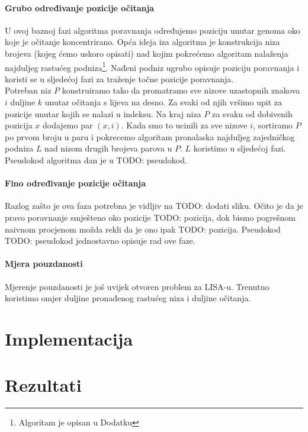\documentclass[times, utf8, diplomski]{fer}
\begin{document}
\subsubsection{Grubo određivanje pozicije očitanja}

U ovoj baznoj fazi algoritma poravnanja određujemo poziciju unutar genoma oko koje je očitanje koncentrirano. Opća ideja iza algoritma je konstrukcija niza brojeva (kojeg ćemo uskoro opisati) nad kojim pokrećemo algoritam nalaženja najduljeg rastućeg podniza\footnote{Algoritam je opisan u Dodatku}. Nađeni podniz ugrubo opisuje poziciju poravnanja i koristi se u sljedećoj fazi za traženje točne pozicije poravnanja.\\
Potreban niz $P$ konstruiramo tako da promatramo sve nizove uzastopnih znakova $i$ duljine $k$ unutar očitanja s lijeva na desno. Za svaki od njih vršimo upit za pozicije unutar kojih se nalazi u indeksu. Na kraj niza $P$ za svaku od dobivenih pozicija $x$ dodajemo par $(x,i)$. Kada smo to ucinili za sve nizove $i$, sortiramo $P$ po prvom broju u paru i pokrecemo algoritam pronalaska najduljeg zajedničkog podniza $L$ nad nizom drugih brojeva parova u $P$. $L$ koristimo u sljedećoj fazi. Pseudokod algoritma dan je u TODO: pseudokod.

\subsubsection{Fino određivanje pozicije očitanja}

Razlog zašto je ova faza potrebna je vidljiv na TODO: dodati sliku. Očito je da je pravo poravnanje smješteno oko pozicije TODO: pozicija, dok bismo pogrešnom naivnom procjenom možda rekli da je ono ipak TODO: pozicija. Pseudokod TODO: pseudokod jednostavno opisuje rad ove faze.

\subsubsection{Mjera pouzdanosti}

Mjerenje pouzdanosti je još uvijek otvoren problem za LISA-u. Trenutno koristimo omjer duljine pronađenog rastućeg niza i duljine očitanja.

\chapter{Implementacija}

\chapter{Rezultati}
\end{document}
